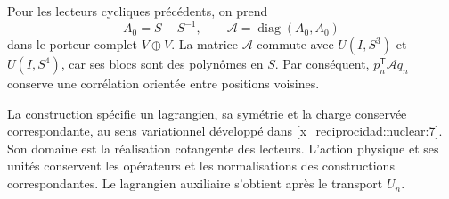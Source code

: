 Pour les lecteurs cycliques précédents, on prend
\[
 A_0=S-S^{-1},\qquad
 \mathcal A=\operatorname{diag}(A_0,A_0)
\]
dans le porteur complet \(V\oplus V\).
La matrice \(\mathcal A\) commute avec \(U(I,S^3)\) et
\(U(I,S^4)\), car ses blocs sont des polynômes en \(S\).
Par conséquent, \(p_n^{\mathsf T}\mathcal A q_n\) conserve
une corrélation orientée entre positions voisines.

La construction spécifie un lagrangien, sa symétrie et la charge
conservée correspondante, au sens variationnel développé
dans \cref{x_reciprocidad:nuclear:7}.
Son domaine est la réalisation cotangente des lecteurs.
L’action physique et ses unités conservent les opérateurs et les
normalisations des constructions correspondantes.
Le lagrangien auxiliaire s’obtient après le transport \(U_n\).
